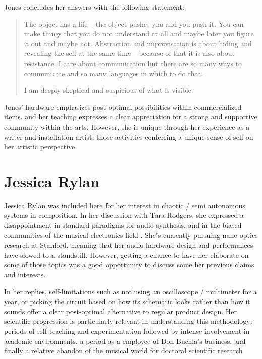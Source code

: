 Jones concludes her answers with the following statement:  

\begin{quote}
The object has a life – the object pushes you and you push it. You can make things that you do not understand at all and maybe later you figure it out and maybe not. Abstraction and improvisation is about hiding and revealing the self at the same time – because of that it is also about resistance. I care about communication but there are so many ways to communicate and so many languages in which to do that.

I am deeply skeptical and suspicious of what is visible.	
\end{quote}

Jones' hardware emphasizes post-optimal possibilities within commercialized items, and her teaching expresses a clear appreciation for a strong and supportive community within the arts. However, she is unique through her experience as a writer and installation artist: those activities conferring a unique sense of self on her artistic perspective. 

\section{Jessica Rylan}

Jessica Rylan was included here for her interest in chaotic / semi autonomous systems in composition. In her discussion with Tara Rodgers, she expressed a disappointment in standard paradigms for audio synthesis, and in the biased communities of the musical electronics field \citep{rodgers2010}. She's currently pursuing nano-optics research at Stanford, meaning that her audio hardware design and performances have slowed to a standstill. However, getting a chance to have her elaborate on some of those topics was a good opportunity to discuss some her previous claims and interests. 

In her replies, self-limitations such as not using an oscilloscope / multimeter for a year, or picking the circuit based on how its schematic looks rather than how it sounds offer a clear post-optimal alternative to regular product design. Her scientific progression is particularly relevant in understanding this methodology: periods of self-teaching and experimentation followed by intense involvement in academic environments, a period as a employee of Don Buchla's business, and finally a relative abandon of the musical world for doctoral scientific research  


